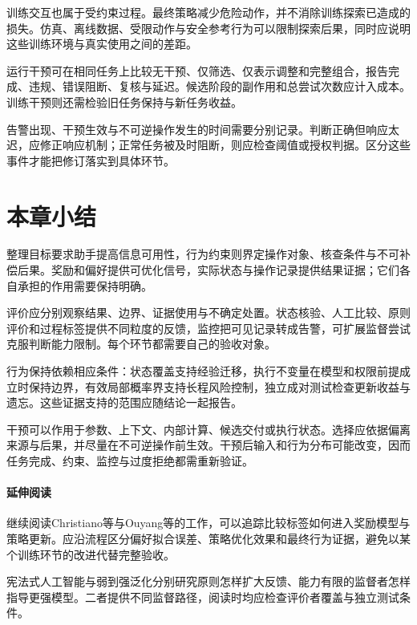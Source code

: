 训练交互也属于受约束过程。最终策略减少危险动作，并不消除训练探索已造成的损失。仿真、离线数据、受限动作与安全参考行为可以限制探索后果，同时应说明这些训练环境与真实使用之间的差距。

运行干预可在相同任务上比较无干预、仅筛选、仅表示调整和完整组合，报告完成、违规、错误阻断、复核与延迟。候选阶段的副作用和总尝试次数应计入成本。训练干预则还需检验旧任务保持与新任务收益。

告警出现、干预生效与不可逆操作发生的时间需要分别记录。判断正确但响应太迟，应修正响应机制；正常任务被及时阻断，则应检查阈值或授权判据。区分这些事件才能把修订落实到具体环节。

\section{本章小结}
\label{sec:alignment-summary}

整理目标要求助手提高信息可用性，行为约束则界定操作对象、核查条件与不可补偿后果。奖励和偏好提供可优化信号，实际状态与操作记录提供结果证据；它们各自承担的作用需要保持明确。

评价应分别观察结果、边界、证据使用与不确定处置。状态核验、人工比较、原则评价和过程标签提供不同粒度的反馈，监控把可见记录转成告警，可扩展监督尝试克服判断能力限制。每个环节都需要自己的验收对象。

行为保持依赖相应条件：状态覆盖支持经验迁移，执行不变量在模型和权限前提成立时保持边界，有效局部概率界支持长程风险控制，独立成对测试检查更新收益与遗忘。这些证据支持的范围应随结论一起报告。

干预可以作用于参数、上下文、内部计算、候选交付或执行状态。选择应依据偏离来源与后果，并尽量在不可逆操作前生效。干预后输入和行为分布可能改变，因而任务完成、约束、监控与过度拒绝都需重新验证。

\paragraph{延伸阅读}

继续阅读Christiano等与Ouyang等的工作，可以追踪比较标签如何进入奖励模型与策略更新。应沿流程区分偏好拟合误差、策略优化效果和最终行为证据，避免以某个训练环节的改进代替完整验收。

宪法式人工智能与弱到强泛化分别研究原则怎样扩大反馈、能力有限的监督者怎样指导更强模型。二者提供不同监督路径，阅读时均应检查评价者覆盖与独立测试条件。